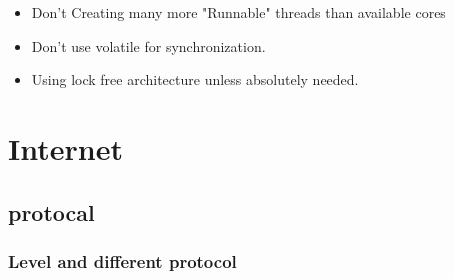 \documentclass[a4paper,11pt,twoside]{book}
\begin{document}
\begin{itemize}
    \item Don't Creating many more "Runnable" threads than available cores

    \item Don't use volatile for synchronization.

    \item Using lock free architecture unless absolutely needed. 
\end{itemize}

\chapter{Internet}
\section{protocal}
\subsection{Level and different protocol}
\end{document}
